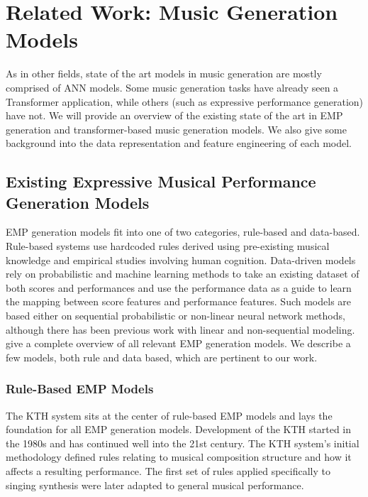 \chapter{Related Work: Music Generation Models}\label{ch:ch4}
As in other fields, state of the art models in music generation are mostly comprised of ANN models. Some music generation tasks have already seen a Transformer application, while others (such as expressive performance generation) have not. We will provide an overview of the existing state of the art in EMP generation and transformer-based music generation models. We also give some background into the data representation and feature engineering of each model. 

\section{Existing Expressive Musical Performance Generation Models}\label{sec:emp_generation_models}
EMP generation models fit into one of two categories, rule-based and data-based. Rule-based systems use hardcoded rules derived using pre-existing musical knowledge and empirical studies involving human cognition. Data-driven models rely on probabilistic and machine learning methods to take an existing dataset of both scores and performances and use the performance data as a guide to learn the mapping between score features and performance features. Such models are based either on sequential probabilistic or non-linear neural network methods\cite{cancino2018computational}, although there has been previous work with linear and non-sequential modeling. \citet{cancino2018computational} give a complete overview of all relevant EMP generation models. We describe a few models, both rule and data based, which are pertinent to our work. 

\subsection{Rule-Based EMP Models}
The KTH system \cite{friberg2006overview} sits at the center of rule-based EMP models and lays the foundation for all EMP generation models. Development of the KTH started in the 1980s and has continued well into the 21st century. The KTH system's initial methodology defined rules relating to musical composition structure and how it affects a resulting performance. The first set of rules applied specifically to singing synthesis were later adapted to general musical performance. 

